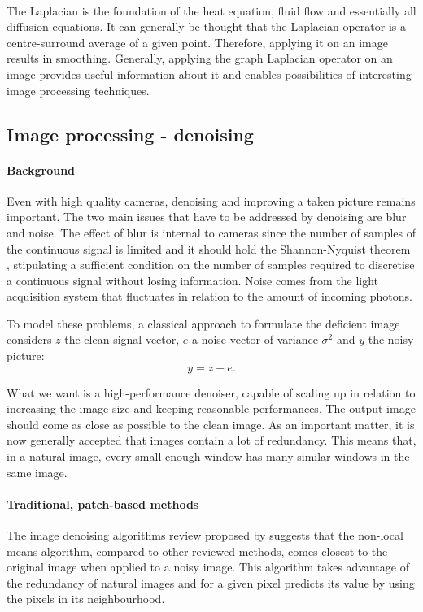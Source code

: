 \paragraph{}
The Laplacian is the foundation of the heat equation, fluid flow and essentially all diffusion equations.
It can generally be thought that the Laplacian operator is a centre-surround average \cite{siam_slides_2016} of a given point.
Therefore, applying it on an image results in smoothing.
Generally, applying the graph Laplacian operator on an image provides useful information about it and enables possibilities of interesting image processing techniques.

\subsection{Image processing - denoising}

\paragraph{Background}
Even with high quality cameras, denoising and improving a taken picture remains important.
The two main issues that have to be addressed by denoising are blur and noise.
The effect of blur is internal to cameras since the number of samples of the continuous signal is limited and it should hold the Shannon-Nyquist theorem \cite{buades_review_2005}, stipulating a sufficient condition on the number of samples required to discretise a continuous signal without losing information.
Noise comes from the light acquisition system that fluctuates in relation to the amount of incoming photons.

To model these problems, a classical approach to formulate the deficient image considers \(z\) the clean signal vector, \(e\) a noise vector of variance \(\sigma^2\) and \(y\) the noisy picture:
\[y = z + e.\]

What we want is a high-performance denoiser, capable of scaling up in relation to increasing the image size and keeping reasonable performances.
The output image should come as close as possible to the clean image.
As an important matter, it is now generally accepted that images contain a lot of redundancy.
This means that, in a natural image, every small enough window has many similar windows in the same image.

\paragraph{Traditional, patch-based methods}
The image denoising algorithms review proposed by \cite{buades_review_2005} suggests that the non-local means algorithm, compared to other reviewed methods, comes closest to the original image when applied to a noisy image.
This algorithm takes advantage of the redundancy of natural images and for a given pixel predicts its value by using the pixels in its neighbourhood.


